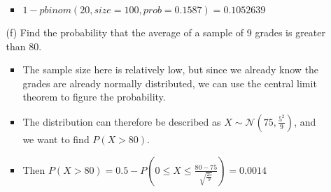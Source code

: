 \documentclass{article}
\begin{document}
\begin{enumerate}
\begin{itemize}
        \begin{itemize}
        \item $1 - pbinom(20, size=100, prob=0.1587) = 0.1052639$
        \end{itemize}
    \item [(f)] Find the probability that the average of a sample of 9 grades is greater than 80.
        \begin{itemize}
        \item The sample size here is relatively low, but since we already know the grades are already normally distributed, we can use the central limit theorem to figure the probability.
        \item The distribution can therefore be described as $X \sim \mathcal{N}(75, \frac{5^2}{9})$, and we want to find $P(X > 80)$.
        \item Then $P(X > 80) = 0.5 - P(0 \leq X \leq \frac{80 - 75}{\sqrt{\frac{25}{9}}}) = 0.0014$
        \end{itemize}
    \end{itemize}


\end{enumerate}
\end{document}
